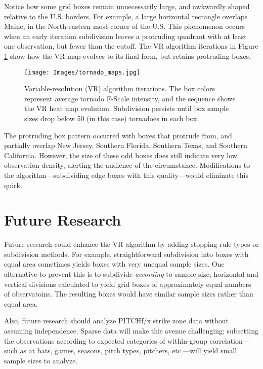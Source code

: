 Notice how some grid boxes remain unnecessarily large, and awkwardly shaped relative to the U.S. borders. For example, a large horizontal rectangle overlaps Maine, in the North-eastern most corner of the U.S. This phenomenon occurs when an early iteration subdivision leaves a protruding quadrant with at least one observation, but fewer than the cutoff. The VR algorithm iterations in Figure \ref{fig:tornado2} show how the VR map evolves to its final form, but retains protruding boxes.
        \begin{figure}[H]
      	\centering      
      	\texttt{[image: Images/tornado\_maps.jpg]}
      	\caption{Variable-resolution (VR) algorithm iterations. The box colors represent average tornado F-Scale intensity, and the sequence shows the VR heat map evolution. Subdivision persists until box sample sizes drop below 50 (in this case) tornadoes in each box.}
      	\label{fig:tornado2}
        \end{figure}
The protruding box pattern occurred with boxes that protrude from, and partially overlap New Jersey, Southern Florida, Southern Texas, and Southern California. However, the size of these odd boxes does still indicate very low observation density, alerting the audience of the circumstance. Modifications to the algorithm---subdividing edge boxes with this quality---would eliminate this quirk.

\section{Future Research}

Future research could enhance the VR algorithm by adding stopping rule types or subdivision methods. For example, straightforward subdivision into boxes with equal area sometimes yields boxes with very unequal sample sizes. One alternative to prevent this is to subdivide {\it according} to sample size; horizontal and vertical divisions calculated to yield grid boxes of approximately equal numbers of observatoins. The resulting boxes would have similar sample sizes rather than equal area.

Also, future research should analyze PITCHf/x\textsuperscript{\textregistered} strike zone data without assuming independence. Sparse data will make this avenue challenging; subsetting the observations according to expected categories of within-group correlation---such as at bats, games, seasons, pitch types, pitchers, etc.---will yield small sample sizes to analyze.

